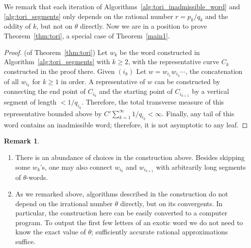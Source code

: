 \documentclass[11pt]{article} %
\theoremstyle{plain}
\theoremstyle{definition}
\newtheorem{rmk}[thm]{Remark}
\numberwithin{equation}{section}
\begin{document}
We remark that each iteration of Algorithms~\ref{alg:tori_inadmissible_word} and \ref{alg:tori_segments} only depends on the rational number $r=p_k/q_k$ and the oddity of $k$, but not on $\theta$ directly. Now we are in a position to prove Theorem~\ref{thm:tori}, a special case of Theorem~\ref{main1}.
\begin{proof}(of Theorem~\ref{thm:tori})
Let $w_{k}$ be the word constructed in Algorithm~\ref{alg:tori_segments} with $k\ge2$, with the representative curve $C_k$ constructed in the proof there. Given $(i_k)$ Let $w=w_{i_1}w_{i_2}\cdots$, the concatenation of all $w_{i_k}$ for $k\ge1$ in order. A representative of $w$ can be constructed by connecting the end point of $C_{i_k}$ and the starting point of $C_{i_{k+1}}$ by a vertical segment of length $<1/q_{i_k}$. Therefore, the total transverse measure of this representative bounded above by $C'\sum_{k=1}^\infty1/q_{i_k}<\infty$. Finally, any tail of this word contains an inadmissible word; therefore, it is not asymptotic to any leaf.
\end{proof}

\begin{rmk}
\begin{enumerate}[topsep=0mm, itemsep=0mm]
    \item There is an abundance of choices in the construction above. Besides skipping some $w_k$'s, one may also connect $w_{i_k}$ and $w_{i_{k+1}}$ with arbitrarily long segments of $\theta$-words.
    \item As we remarked above, algorithms described in the construction do not depend on the irrational number $\theta$ directly, but on its convergents. In particular, the construction here can be easily converted to a computer program. To output the first few letters of an exotic word we do not need to know the exact value of $\theta$; sufficiently accurate rational approximations suffice.
\end{enumerate}
\end{rmk}
\end{document}
